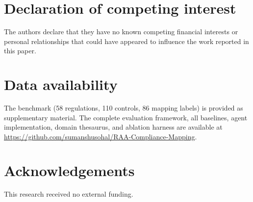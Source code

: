 \documentclass[a4paper,fleqn]{cas-sc}
\begin{document}
\printcredits

\section*{Declaration of competing interest}
The authors declare that they have no known competing financial interests or personal relationships that could have appeared to influence the work reported in this paper.

\section*{Data availability}
The benchmark (58 regulations, 110 controls, 86 mapping labels) is provided as supplementary material.
The complete evaluation framework, all baselines, agent implementation, domain thesaurus, and ablation harness are available at \url{https://github.com/sumanshusohal/RAA-Compliance-Mapping}.

\section*{Acknowledgements}
This research received no external funding.




\end{document}
